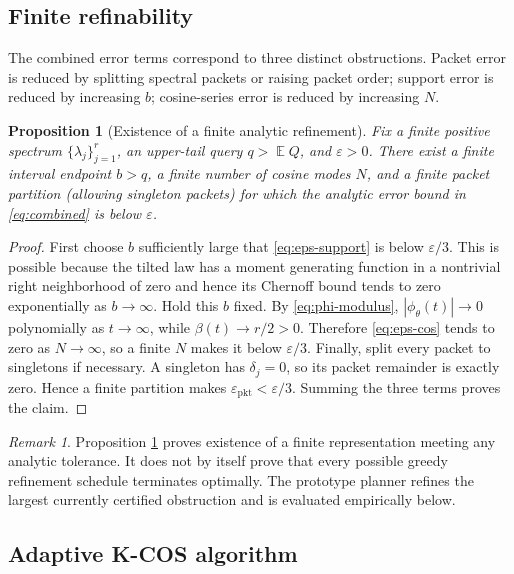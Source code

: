 \documentclass[11pt]{article}
\newtheorem{proposition}[theorem]{Proposition}
\theoremstyle{definition}
\theoremstyle{remark}
\newtheorem{remark}[theorem]{Remark}
\DeclareMathOperator{\E}{\mathbb E}
\newcommand{\eps}{\varepsilon}
\begin{document}
\subsection{Finite refinability}

The combined error terms correspond to three distinct obstructions. Packet error is reduced by splitting spectral packets or raising packet order; support error is reduced by increasing $b$; cosine-series error is reduced by increasing $N$.

\begin{proposition}[Existence of a finite analytic refinement]
\label{prop:finite-refinement}
Fix a finite positive spectrum $\{\lambda_j\}_{j=1}^{r}$, an upper-tail query $q>\E Q$, and $\eps>0$. There exist a finite interval endpoint $b>q$, a finite number of cosine modes $N$, and a finite packet partition (allowing singleton packets) for which the analytic error bound in \eqref{eq:combined} is below $\eps$.
\end{proposition}

\begin{proof}
First choose $b$ sufficiently large that \eqref{eq:eps-support} is below $\eps/3$. This is possible because the tilted law has a moment generating function in a nontrivial right neighborhood of zero and hence its Chernoff bound tends to zero exponentially as $b\to\infty$. Hold this $b$ fixed. By \eqref{eq:phi-modulus}, $|\phi_{\theta}(t)|\to0$ polynomially as $t\to\infty$, while $\beta(t)\to r/2>0$. Therefore \eqref{eq:eps-cos} tends to zero as $N\to\infty$, so a finite $N$ makes it below $\eps/3$. Finally, split every packet to singletons if necessary. A singleton has $\delta_j=0$, so its packet remainder is exactly zero. Hence a finite partition makes $\eps_{\mathrm{pkt}}<\eps/3$. Summing the three terms proves the claim.
\end{proof}

\begin{remark}\label{claim:final-26-14}
Proposition \ref{prop:finite-refinement} proves existence of a finite representation meeting any analytic tolerance. It does not by itself prove that every possible greedy refinement schedule terminates optimally. The prototype planner refines the largest currently certified obstruction and is evaluated empirically below.
\end{remark}

\subsection{Adaptive K-COS algorithm}
\end{document}
